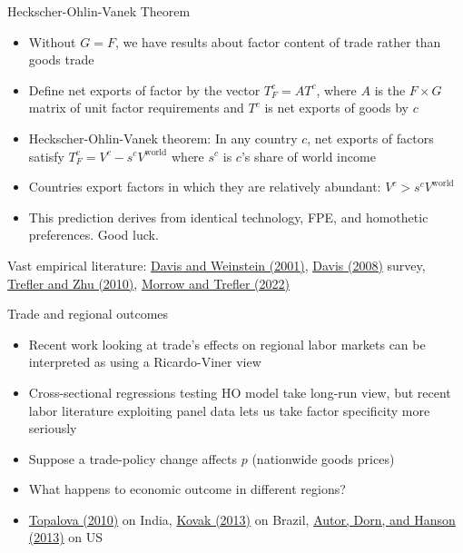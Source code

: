 \documentclass[11pt,notes=hide,aspectratio=169]{beamer}
\begin{document}
\begin{frame}{Heckscher-Ohlin-Vanek Theorem}
\begin{itemize}
	\item Without $G=F$, we have results about factor content of trade rather than goods trade
	\item Define net exports of factor by the vector $T_{F}^{c} = AT^c$, where $A$ is the $F \times G$ matrix of unit factor requirements and $T^c$ is net exports of goods by $c$
	\item Heckscher-Ohlin-Vanek theorem: In any country $c$, net exports of factors satisfy $T_F^c = V^c - s^c V^{\text{world}}$ where $s^c$ is $c$'s share of world income
	\item Countries export factors in which they are relatively abundant: $V^c > s^c V^{\text{world}}$ 
	\item This prediction derives from identical technology, FPE, and homothetic preferences.
	Good luck.
\end{itemize}
Vast empirical literature:
\href{https://www.aeaweb.org/articles?id=10.1257/aer.91.5.1423}{Davis and Weinstein (2001)},
\href{https://link.springer.com/rwe/10.1007/978-1-349-58802-2_541}{Davis (2008)} survey,
\href{https://doi.org/10.1016/j.jinteco.2010.07.006}{Trefler and Zhu (2010)},
\href{https://doi.org/10.1016/j.jinteco.2022.103620}{Morrow and Trefler (2022)}
\end{frame}
\begin{frame}{Trade and regional outcomes}
\begin{itemize}
	\item Recent work looking at trade's effects on regional labor markets can be interpreted as using a Ricardo-Viner view
	\item Cross-sectional regressions testing HO model take long-run view, but recent labor literature exploiting panel data lets us take factor specificity more seriously
	\item Suppose a trade-policy change affects $p$ (nationwide goods prices)
	\item What happens to economic outcome in different regions?
	\item \href{https://www.aeaweb.org/articles?id=10.1257/app.2.4.1}{Topalova (2010)} on India,
	\href{https://www.aeaweb.org/articles?id=10.1257/aer.103.5.1960}{Kovak (2013)} on Brazil,
	\href{https://www.aeaweb.org/articles?id=10.1257/aer.103.6.2121}{Autor, Dorn, and Hanson (2013)} on US
\end{itemize}
\end{frame}
\end{document}
